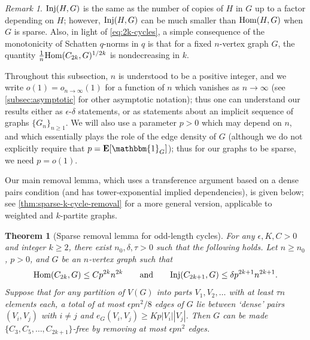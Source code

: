 \documentclass[reqno,11pt]{amsart}
\newtheorem{theorem}{Theorem}[section]
\theoremstyle{definition}
\theoremstyle{remark}
\newtheorem*{remark}{Remark}
\numberwithin{equation}{section}
\newcommand{\E}{\mathbf{E}}
\newcommand{\one}{\mathbbm{1}}
\newcommand{\Hom}{\textnormal{Hom}}
\newcommand{\Inj}{\textnormal{Inj}}
\begin{document}
\begin{remark}
$\Inj(H, G)$ is the same as the number of copies of $H$ in $G$ up to a factor depending on $H$; however, $\Inj(H, G)$ can be much smaller than $\Hom(H, G)$ when $G$ is sparse. Also, in light of \cref{eq:2k-cycles}, a simple consequence of the monotonicity of Schatten $q$-norms in $q$ is that for a fixed $n$-vertex graph $G$, the quantity $\frac{1}{n}\Hom(C_{2k},G)^{1/2k}$ is nondecreasing in $k$.
\end{remark}

Throughout this subsection, $n$ is understood to be a positive integer, and we write $o(1) = o_{n \to \infty}(1)$ for a function of $n$ which vanishes as $n \to \infty$ (see \cref{subsec:asymptotic} for other asymptotic notation); thus one can understand our results either as $\epsilon$-$\delta$ statements, or as statements about an implicit sequence of graphs $\{G_n\}_{n \ge 1}$. We will also use a parameter $p > 0$ which may depend on $n$, and which essentially plays the role of the edge density of $G$ (although we do not explicitly require that $p = \E[\one_G]$); thus for our graphs to be sparse, we need $p = o(1)$. %

Our main removal lemma, which uses a transference argument based on a dense pairs condition (and has tower-exponential implied dependencies), is given below; see \cref{thm:sparse-k-cycle-removal} for a more general version, applicable to weighted and $k$-partite graphs. 

\begin{theorem}[Sparse removal lemma for odd-length cycles] \label{thm:sparse-removal-odd-cycles}
For any $\epsilon, K, C > 0$ and integer $k \ge 2$, there exist $n_0, \delta, \tau > 0$ such that the following holds. Let $n \ge n_0$, $p > 0$, and $G$ be an $n$-vertex graph such that
\[
    \Hom(C_{2k}, G) \le C p^{2k} n^{2k} \qquad \text{and} 
    \qquad 
    \Inj(C_{2k+1}, G) \le \delta p^{2k+1} n^{2k+1}.
\]
Suppose that for any partition of $V(G)$ into parts $V_1, V_2, \ldots$ with at least $\tau n$ elements each, a total of at most $\epsilon p n^2/8$ edges of $G$ lie between `dense' pairs $(V_i, V_j)$ with $i \neq j$ and $e_G(V_i, V_j) \ge K p |V_i| |V_j|$. Then $G$ can be made $\{C_3, C_5, \ldots, C_{2k+1}\}$-free by removing at most $\epsilon pn^2$ edges.
\end{theorem}
\end{document}
